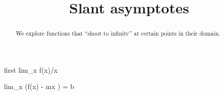 \documentclass{ximera}
\title[Dig-In:]{Slant asymptotes}
\begin{document}
\begin{abstract}
We explore functions that ``shoot to infinity'' at certain points in
their domain.
\end{abstract}
\maketitle

first lim_{x\to\infty} f(x)/x

lim_{x\to\infty} \left(f(x) - mx \right) = b
\end{document}
